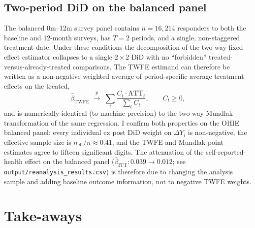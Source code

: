 \documentclass[11pt]{article}
\begin{document}
\subsection{Two-period DiD on the balanced panel}

The balanced 0m--12m survey panel contains $n=16{,}214$ responders to
both the baseline and 12-month surveys, has $T=2$ periods, and a
single, non-staggered treatment date. Under these conditions the
\citet{GB2021} decomposition of the two-way fixed-effect estimator
collapses to a single $2\!\times\!2$ DiD with no ``forbidden''
treated-versus-already-treated comparisons. The TWFE estimand can
therefore be written as a non-negative weighted average of
period-specific average treatment effects on the treated,
\[
    \hat\beta_{\text{TWFE}} \;\xrightarrow{p}\;
    \sum_{t} \frac{C_{t}\cdot \text{ATT}_{t}}{\sum_{t} C_{t}},
    \qquad C_{t}\ge 0,
\]
and is numerically identical (to machine precision) to the two-way
Mundlak transformation of the same regression. I confirm both
properties on the OHIE balanced panel: every individual ex post DiD
weight on $\Delta Y_{i}$ is non-negative, the effective sample size is
$n_{\text{eff}}/n \approx 0.41$, and the TWFE and Mundlak point
estimates agree to fifteen significant digits. The attenuation of the
self-reported-health effect on the balanced panel
($\hat\beta_{\text{ITT}}: 0.039 \to 0.012$; see
\texttt{output/reanalysis\_results.csv}) is therefore due to changing
the analysis sample and adding baseline outcome information, not to
negative TWFE weights.

\section{Take-aways}
\end{document}
